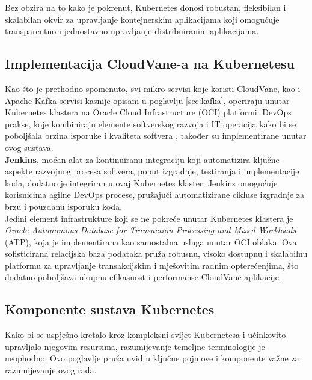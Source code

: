 \documentclass[times, utf8, diplomski]{fer}
\begin{document}
Bez obzira na to kako je pokrenut, Kubernetes donosi robustan, fleksibilan i skalabilan okvir za upravljanje kontejnerskim aplikacijama koji omogućuje transparentno i jednostavno upravljanje distribuiranim aplikacijama.

\subsection{Implementacija CloudVane-a na Kubernetesu}

Kao što je prethodno spomenuto, svi mikro-servisi koje koristi CloudVane, kao i Apache Kafka servisi kasnije opisani u poglavlju \ref{sec:kafka}, operiraju unutar Kubernetes klastera na Oracle Cloud Infrastructure (OCI) platformi. DevOps prakse, koje kombiniraju elemente softverskog razvoja  i IT operacija  kako bi se poboljšala brzina isporuke i kvaliteta softvera \citep{courtemanche_what_nodate}, također su implementirane unutar ovog sustava.\\

\textbf{Jenkins}, moćan alat za kontinuiranu integraciju koji automatizira ključne aspekte razvojnog procesa softvera, poput izgradnje, testiranja i implementacije koda, dodatno je integriran u ovaj Kubernetes klaster. Jenkins omogućuje korisnicima agilne DevOps procese, pružajući automatizirane cikluse izgradnje za brzu i pouzdanu isporuku koda.\\

Jedini element infrastrukture koji se ne pokreće unutar Kubernetes klastera je \emph{Oracle Autonomous Database for Transaction Processing and Mixed Workloads} (ATP), koja je implementirana kao samostalna usluga unutar OCI oblaka. Ova sofisticirana relacijska baza podataka pruža robusnu, visoko dostupnu i skalabilnu platformu za upravljanje transakcijskim i mješovitim radnim opterećenjima, što dodatno poboljšava ukupnu efikasnost i performanse CloudVane aplikacije.\\

\subsection{Komponente sustava Kubernetes}
\label{sec:k8sComponents}

Kako bi se uspješno kretalo kroz kompleksni svijet Kubernetesa i učinkovito upravljalo njegovim resursima, razumijevanje temeljne terminologije je neophodno. Ovo poglavlje pruža uvid u ključne pojmove i komponente važne za razumijevanje ovog rada.
\end{document}
